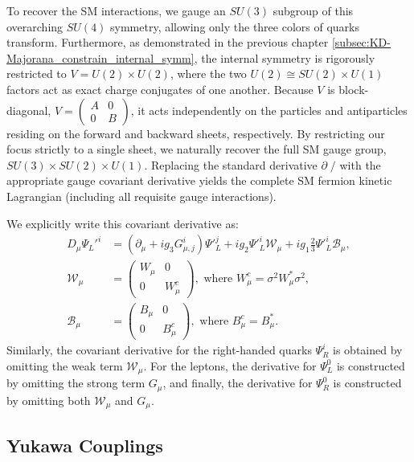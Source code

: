 To recover the SM interactions, we gauge an $SU(3)$ subgroup of this overarching $SU(4)$ symmetry, allowing only the three colors of quarks transform. Furthermore, as demonstrated in the previous chapter \cref{subsec:KD-Majorana_constrain_internal_symm}, the internal symmetry is rigorously restricted to $V=U(2)\times U(2)$, where the two $U(2) \cong SU(2)\times U(1)$ factors act as exact charge conjugates of one another. Because $V$ is block-diagonal, $V=\begin{pmatrix}A &0\\ 0&B\end{pmatrix}$, it acts independently on the particles and antiparticles residing on the forward and backward sheets, respectively. By restricting our focus strictly to a single sheet, we naturally recover the full SM gauge group, $SU(3)\times SU(2)\times U(1)$. Replacing the standard derivative $\partial\!\!\!\!\;\!/$ with the appropriate gauge covariant derivative yields the complete SM fermion kinetic Lagrangian (including all requisite gauge interactions). 

We explicitly write this covariant derivative as:
\begin{equation}
\begin{aligned}
    D_\mu\Psi_L'^i&=(\partial_\mu+ig_3 G_{\mu,j}^i)\Psi'^j_L+ig_2\Psi'^i_L \mathcal W_\mu+ig_1\frac{2}{3}\Psi'^i_L \mathcal B_\mu,\\
    \mathcal W_\mu&=\begin{pmatrix}W_\mu &0\\ 0 & W_\mu^c\end{pmatrix}, \text{ where } W_\mu^c=\sigma^2W_\mu^*\sigma^2, \\ \mathcal{B}_\mu&=\begin{pmatrix}B_\mu &0\\ 0 & B_\mu^c\end{pmatrix}, \text{ where } B_\mu^c=B_\mu^*.
\end{aligned}
\end{equation}
Similarly, the covariant derivative for the right-handed quarks $\Psi_R^i$ is obtained by omitting the weak term $\mathcal W_\mu$. For the leptons, the derivative for $\Psi_L^0$ is constructed by omitting the strong term $G_\mu$, and finally, the derivative for $\Psi_R^0$ is constructed by omitting both $\mathcal W_\mu$ and $G_\mu$.

\vspace{0.25cm}
\subsection{Yukawa Couplings}

